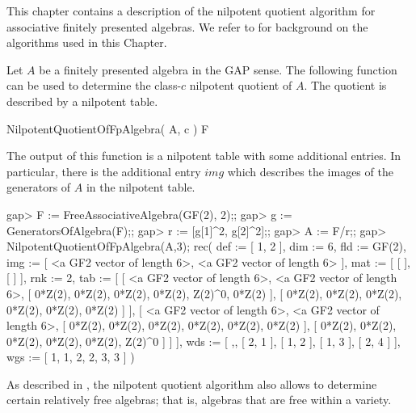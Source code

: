 

This chapter contains a description of the nilpotent quotient algorithm
for associative finitely presented algebras. We refer to \cite{Eic11} for 
background on the algorithms used in this Chapter.


Let $A$ be a finitely presented algebra in the GAP sense. The following
function can be used to determine the class-$c$ nilpotent quotient of $A$.
The quotient is described by a nilpotent table.

\> NilpotentQuotientOfFpAlgebra( A, c ) F

The output of this function is a nilpotent table with some additional
entries. In particular, there is the additional entry $img$ which 
describes the images of the generators of $A$ in the nilpotent table.


\beginexample
gap> F := FreeAssociativeAlgebra(GF(2), 2);;
gap> g := GeneratorsOfAlgebra(F);;
gap> r := [g[1]^2, g[2]^2];;
gap> A := F/r;;
gap> NilpotentQuotientOfFpAlgebra(A,3);
rec( def := [ 1, 2 ], dim := 6, fld := GF(2), 
  img := [ <a GF2 vector of length 6>, <a GF2 vector of length 6> ], 
  mat := [ [  ], [  ] ], rnk := 2, 
  tab := [ [ <a GF2 vector of length 6>, <a GF2 vector of length 6>, 
          [ 0*Z(2), 0*Z(2), 0*Z(2), 0*Z(2), Z(2)^0, 0*Z(2) ], 
          [ 0*Z(2), 0*Z(2), 0*Z(2), 0*Z(2), 0*Z(2), 0*Z(2) ] ], 
      [ <a GF2 vector of length 6>, <a GF2 vector of length 6>, 
          [ 0*Z(2), 0*Z(2), 0*Z(2), 0*Z(2), 0*Z(2), 0*Z(2) ], 
          [ 0*Z(2), 0*Z(2), 0*Z(2), 0*Z(2), 0*Z(2), Z(2)^0 ] ] ], 
  wds := [ ,, [ 2, 1 ], [ 1, 2 ], [ 1, 3 ], [ 2, 4 ] ], 
  wgs := [ 1, 1, 2, 2, 3, 3 ] )
\endexample


As described in \cite{Eic11}, the nilpotent quotient algorithm also allows
to determine certain relatively free algebras; that is, algebras that are
free within a variety.


